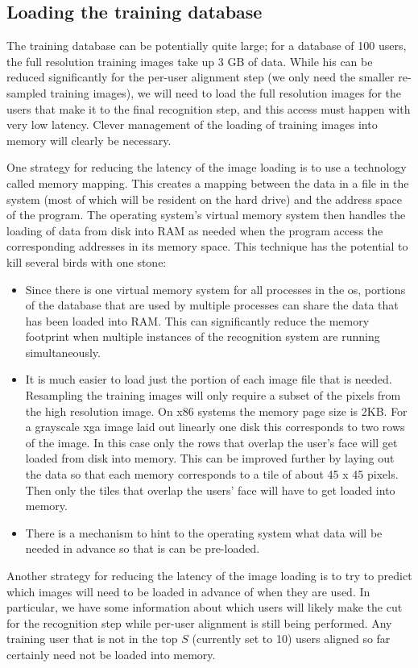 \subsection{Loading the training database}  
The training database can be potentially quite large; for a database of 100 users, the full resolution training images take up 3 GB of data.  While his can be reduced significantly for the per-user alignment step (we only need the smaller re-sampled training images), we will need to load the full resolution images for the users that make it to the final recognition step, and this access must happen with very low latency.  Clever management of the loading of training images into memory will clearly be necessary.

One strategy for reducing the latency of the image loading is to use a technology called memory mapping.  This creates a mapping between the data in a file in the system (most of which will be resident on the hard drive) and the address space of the program.  The operating system's virtual memory system then handles the loading of data from disk into RAM as needed when the program access the corresponding addresses in its memory space.  This technique has the potential to kill several birds with one stone:
\begin{itemize}
\item Since there is one virtual memory system for all processes in the os, portions of the database that are used by multiple processes can share the data that has been loaded into RAM.  This can significantly reduce the memory footprint when multiple instances of the recognition system are running simultaneously.
\item It is much easier to load just the portion of each image file that is needed.  Resampling the training images will only require a subset of the pixels from the high resolution image.  On x86 systems the memory page size is 2KB.  For a grayscale xga image laid out linearly one disk this corresponds to two rows of the image.  In this case only the rows that overlap the user's face will get loaded from disk into memory.  This can be improved further by laying out the data so that each memory corresponds to a tile of about 45 x 45 pixels.  Then only the tiles that overlap the users' face will have to get loaded into memory.
\item There is a mechanism to hint to the operating system what data will be needed in advance so that is can be pre-loaded.  
\end{itemize} 
Another strategy for reducing the latency of the image loading is to try to predict which images will need to be loaded in advance of when they are used.  In particular, we have some information about which users will likely make the cut for the recognition step while per-user alignment is still being performed.  Any training user that is not in the top $S$ (currently set to 10) users aligned so far certainly need not be loaded into memory.  

